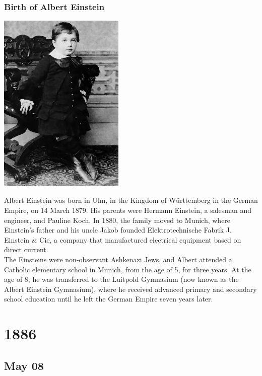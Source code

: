 \documentclass[11pt]{report}
\begin{document}
\subsection{Birth of Albert Einstein}
\vspace{2mm}\begin{center}\includegraphics[width=6cm]{./img/youngEinstein.jpg}\end{center}
Albert Einstein was born in Ulm, in the Kingdom of Württemberg in the German Empire, on 14 March 1879. His parents were Hermann Einstein, a salesman and engineer, and Pauline Koch. In 1880, the family moved to Munich, where Einstein's father and his uncle Jakob founded Elektrotechnische Fabrik J. Einstein \& Cie, a company that manufactured electrical equipment based on direct current.\\
The Einsteins were non-observant Ashkenazi Jews, and Albert attended a Catholic elementary school in Munich, from the age of 5, for three years. At the age of 8, he was transferred to the Luitpold Gymnasium (now known as the Albert Einstein Gymnasium), where he received advanced primary and secondary school education until he left the German Empire seven years later.

\chapter{1886}
\section{May 08}
\end{document}
